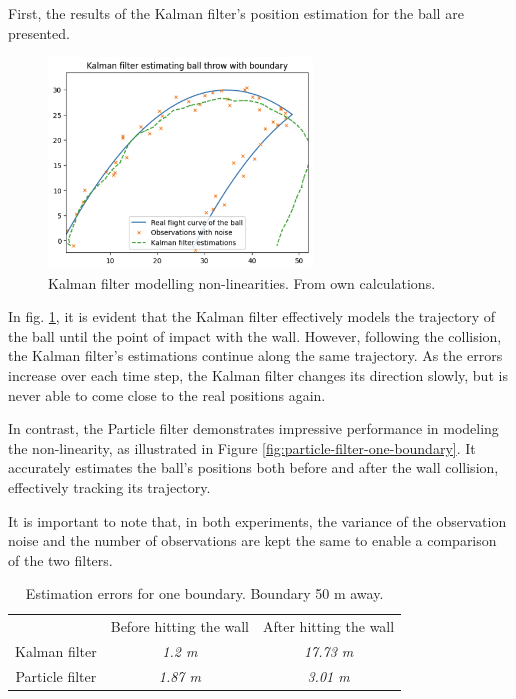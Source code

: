 \documentclass[conference]{IEEEtran}
\begin{document}
First, the results of the Kalman filter's position estimation for the ball are presented.
\begin{figure}
	\centering
	\includegraphics[width=70mm]{figs/kalman-filter.png}
	\caption{Kalman filter modelling non-linearities. From own calculations.}
	\label{fig:kalman-filter}
\end{figure}

In fig. \ref{fig:kalman-filter}, it is evident that the Kalman filter effectively models the trajectory of the ball until the point of impact with the wall.
However, following the collision, the Kalman filter's estimations continue along the same trajectory.
As the errors increase over each time step, the Kalman filter changes its direction slowly, but is never able to come close to the real positions again.

In contrast, the Particle filter demonstrates impressive performance in modeling the non-linearity, as illustrated in Figure \ref{fig:particle-filter-one-boundary}.
It accurately estimates the ball's positions both before and after the wall collision, effectively tracking its trajectory.

It is important to note that, in both experiments, the variance of the observation noise and the number of observations are kept the same to enable a comparison of the two filters.
\begin{table}[htbp]
    \caption{Estimation errors for one boundary. Boundary 50 m away.}
    \begin{center}
    \begin{tabular}{|c|c|c|}
    \cline{1-3}
    & Before hitting the wall & After hitting the wall \\
    \cline{1-3} 
    Kalman filter & \textit{1.2 m} & \textit{17.73 m} \\
    \cline{1-3} 
    Particle filter & \textit{1.87 m} & \textit{3.01 m} \\
    \hline
    \end{tabular}
    \label{tab:comparing-kalman-particle}
    \end{center}
\end{table}
\end{document}
